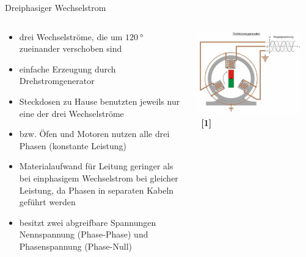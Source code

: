 \documentclass[aspectratio=1610, professionalfonts, 9pt]{beamer}
\begin{document}
\begin{frame}{Dreiphasiger Wechselstrom}
  \begin{columns}
    \begin{column}{0.5\textwidth}
\begin{itemize}
  \item drei Wechselströme, die um $\SI{120}{\degree}$ zueinander verschoben sind
  \item einfache Erzeugung durch Drehstromgenerator
  \item Steckdosen zu Hause benutzten jeweils nur eine der drei Wechselströme
  \item bzw. Öfen und Motoren nutzen alle drei Phasen (konstante Leistung)
  \item Materialaufwand für Leitung geringer als bei einphasigem Wechselstrom bei gleicher Leistung,
   da Phasen in separaten Kabeln geführt werden
  \item besitzt zwei abgreifbare Spannungen  Nennspannung (Phase-Phase) und Phasenspannung (Phase-Null)
\end{itemize}
\end{column}
\begin{column}{0.5\textwidth}
\centering
\includegraphics[width=0.9\textwidth]{images/Drehstromgenerator.jpg} \ \textbf{\textcolor{tugreen}{[1]}}
\end{column}
\end{columns}
\end{frame}
\end{document}
